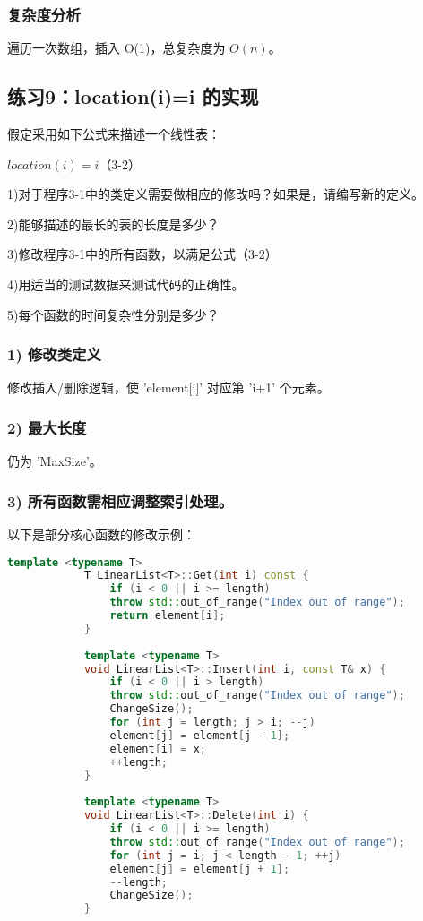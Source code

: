 \documentclass[UTF8]{ctexart}
\begin{document}
		\subsubsection{复杂度分析}
		
		遍历一次数组，插入 O(1)，总复杂度为 $ O(n) $。
		\subsection{练习9：location(i)=i 的实现}
		假定采用如下公式来描述一个线性表：
		
		$location(i)=i$（3-2）
		
		1)对于程序3-1中的类定义需要做相应的修改吗？如果是，请编写新的定义。
		
		2)能够描述的最长的表的长度是多少？
		
		3)修改程序3-1中的所有函数，以满足公式（3-2）
		
		4)用适当的测试数据来测试代码的正确性。
		
		5)每个函数的时间复杂性分别是多少？
		
		\subsubsection{1) 修改类定义}
		
		修改插入/删除逻辑，使 'element[i]' 对应第 'i+1' 个元素。
		\subsubsection{2) 最大长度}
		
		仍为 'MaxSize'。
		\subsubsection{3) 所有函数需相应调整索引处理。}
		
		以下是部分核心函数的修改示例：
		
		\begin{lstlisting}[language=C++]
			template <typename T>
			T LinearList<T>::Get(int i) const {
				if (i < 0 || i >= length)
				throw std::out_of_range("Index out of range");
				return element[i];
			}
			
			template <typename T>
			void LinearList<T>::Insert(int i, const T& x) {
				if (i < 0 || i > length)
				throw std::out_of_range("Index out of range");
				ChangeSize();
				for (int j = length; j > i; --j)
				element[j] = element[j - 1];
				element[i] = x;
				++length;
			}
			
			template <typename T>
			void LinearList<T>::Delete(int i) {
				if (i < 0 || i >= length)
				throw std::out_of_range("Index out of range");
				for (int j = i; j < length - 1; ++j)
				element[j] = element[j + 1];
				--length;
				ChangeSize();
			}
		\end{lstlisting}
			
\end{document}

